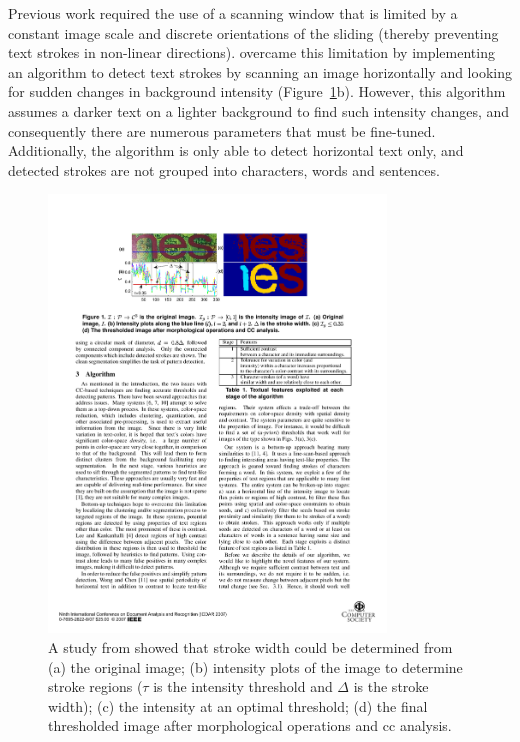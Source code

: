 Previous work required the use of a scanning window \citep{XiangrongChen:2004ha, Lienhart:2002ub, Jung:2009do} that is limited by a constant image scale and discrete orientations of the sliding (thereby preventing text strokes in non-linear directions). \citet{Subramanian:2007tf} overcame this limitation by implementing an algorithm to detect text strokes by scanning an image horizontally and looking for sudden changes in background intensity (Figure~\ref{fig:background:detection:cc:subramanian2007_intensity}b). However, this algorithm assumes a darker text on a lighter background to find such intensity changes, and consequently there are numerous parameters that must be fine-tuned. Additionally, the algorithm is only able to detect horizontal text only, and detected strokes are not grouped into characters, words and sentences.

\begin{figure}[h]
  \centering
  \includegraphics[width=0.8\textwidth]{images/background/subramanian2007_intensity}
  \caption[Stroke analysis from \citet{Subramanian:2007tf}]{A study from \citet{Subramanian:2007tf} showed that stroke width could be determined from (a) the original image; (b) intensity plots of the image to determine stroke regions ($\tau$ is the intensity threshold and $\Delta$ is the stroke width); (c) the intensity at an optimal threshold; (d) the final thresholded image after morphological operations and \gls{cc} analysis.}
  \label{fig:background:detection:cc:subramanian2007_intensity}
\end{figure}

